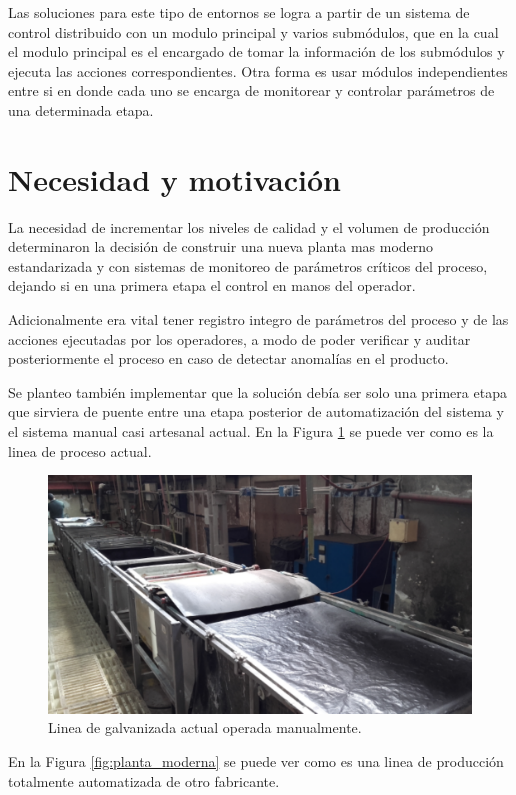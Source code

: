 Las soluciones para este tipo de entornos se logra a partir de un sistema de control distribuido con un modulo principal y varios submódulos, que en la cual el modulo principal es el encargado de tomar la información de los submódulos y ejecuta las acciones correspondientes. 
Otra forma es usar módulos independientes entre si en donde cada uno se encarga de monitorear y controlar parámetros de una determinada etapa.

\section{ Necesidad y motivación }

La necesidad de incrementar los niveles de calidad y el volumen de producción determinaron la decisión de construir una nueva planta mas moderno estandarizada y con sistemas de monitoreo de parámetros críticos del proceso, dejando si en una primera etapa el control en manos del operador.

Adicionalmente era vital tener registro integro de parámetros del proceso y de las acciones ejecutadas por los operadores, a modo de poder verificar y auditar posteriormente el proceso en caso de detectar anomalías en el producto.

Se planteo también implementar que la solución debía ser solo una primera etapa que sirviera de puente entre una etapa posterior de automatización del sistema y el sistema manual casi artesanal actual. En la Figura \ref{fig:planta_actual} se puede ver como es la linea de proceso actual.

\begin{figure}[h]
	\centering
	\includegraphics[width=.8\textwidth]{Figures/Cap_1/planta_actual}
	\caption{Linea de galvanizada actual operada manualmente.}
	\label{fig:planta_actual}
\end{figure}

En la Figura \ref{fig:planta_moderna} se puede ver como es una linea de producción totalmente automatizada de otro fabricante.

